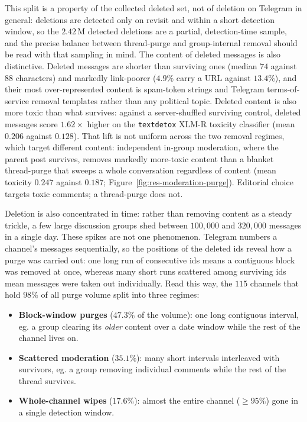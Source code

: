 This split is a property of the collected deleted set, not of deletion on Telegram in general: deletions are detected only on revisit and within a short detection window, so the $2.42$\,M detected deletions are a partial, detection-time sample, and the precise balance between thread-purge and group-internal removal should be read with that sampling in mind. The content of deleted messages is also distinctive. Deleted messages are shorter than surviving ones (median $74$ against $88$ characters) and markedly link-poorer ($4.9\%$ carry a URL against $13.4\%$), and their most over-represented content is spam-token strings and Telegram terms-of-service removal templates rather than any political topic. Deleted content is also more toxic than what survives: against a server-shuffled surviving control, deleted messages score $1.62\times$ higher on the \texttt{textdetox} XLM-R toxicity classifier (mean $0.206$ against $0.128$). That lift is not uniform across the two removal regimes, which target different content: independent in-group moderation, where the parent post survives, removes markedly more-toxic content than a blanket thread-purge that sweeps a whole conversation regardless of content (mean toxicity $0.247$ against $0.187$; Figure~\ref{fig:res-moderation-purge}). Editorial choice targets toxic comments; a thread-purge does not.

Deletion is also concentrated in time: rather than removing content as a steady trickle, a few large discussion groups shed between $100{,}000$ and $320{,}000$ messages in a single day. These spikes are not one phenomenon. Telegram numbers a channel's messages sequentially, so the positions of the deleted ids reveal how a purge was carried out: one long run of consecutive ids means a contiguous block was removed at once, whereas many short runs scattered among surviving ids mean messages were taken out individually. Read this way, the $115$ channels that hold $98\%$ of all purge volume split into three regimes:

\begin{itemize}
\item \textbf{Block-window purges} ($47.3\%$ of the volume): one long contiguous interval, eg. a group clearing its \emph{older} content over a date window while the rest of the channel lives on.
\item \textbf{Scattered moderation} ($35.1\%$): many short intervals interleaved with survivors, eg. a group removing individual comments while the rest of the thread survives.
\item \textbf{Whole-channel wipes} ($17.6\%$): almost the entire channel ($\geq 95\%$) gone in a single detection window.
\end{itemize}

